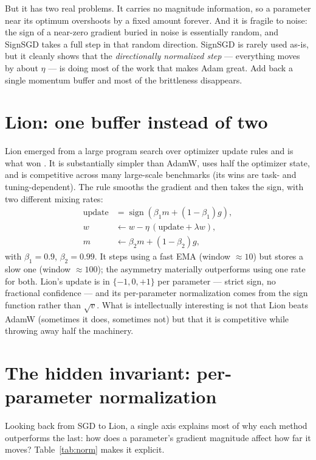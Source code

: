\documentclass[10pt,conference]{IEEEtran}
\newcommand{\sign}{\operatorname{sign}}
\begin{document}
But it has two real problems. It carries no magnitude information, so a parameter
near its optimum overshoots by a fixed amount forever. And it is fragile to noise:
the sign of a near-zero gradient buried in noise is essentially random, and
SignSGD takes a full step in that random direction. SignSGD is rarely used as-is,
but it cleanly shows that the \emph{directionally normalized step} --- everything
moves by about $\eta$ --- is doing most of the work that makes Adam great. Add
back a single momentum buffer and most of the brittleness disappears.

\section{Lion: one buffer instead of two}
Lion emerged from a large program search over optimizer update rules and is what
won \cite{ref6}. It is substantially simpler than AdamW, uses half the optimizer
state, and is competitive across many large-scale benchmarks (its wins are
task- and tuning-dependent). The rule smooths the gradient and then takes the
sign, with two different mixing rates:
\begin{equation}
\begin{aligned}
\text{update} &= \sign(\beta_1 m + (1-\beta_1) g), \\
w &\leftarrow w - \eta\,(\text{update} + \lambda w), \\
m &\leftarrow \beta_2 m + (1-\beta_2) g,
\end{aligned}
\end{equation}
with $\beta_1=0.9$, $\beta_2=0.99$. It steps using a fast EMA (window $\approx 10$)
but stores a slow one (window $\approx 100$); the asymmetry materially
outperforms using one rate for both. Lion's update is in $\{-1,0,+1\}$ per
parameter --- strict sign, no fractional confidence --- and its per-parameter
normalization comes from the sign function rather than $\sqrt{v}$. What is
intellectually interesting is not that Lion beats AdamW (sometimes it does,
sometimes not) but that it is competitive while throwing away half the machinery.

\section{The hidden invariant: per-parameter normalization}
Looking back from SGD to Lion, a single axis explains most of why each method
outperforms the last: how does a parameter's gradient magnitude affect how far it
moves? Table~\ref{tab:norm} makes it explicit.
\end{document}
